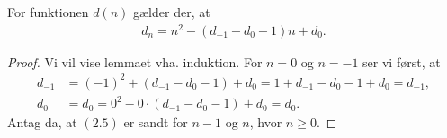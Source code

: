 \begin{lemma}
For funktionen $d(n)$ gælder der, at 
\begin{align}
	d_n = n^2 - (d_{-1} - d_0 - 1)n + d_0.
\end{align}
\end{lemma}
\begin{proof}
Vi vil vise lemmaet vha. induktion. For $n=0$ og $n=-1$ ser vi først, at
\begin{align*}
	d_{-1} &= (-1)^2 + (d_{-1} - d_0 - 1) + d_0 = 1 + d_{-1} - d_0 -1 + d_0 = d_{-1}, \\
	d_0 &= d_0 = 0^2 - 0 \cdot (d_{-1} - d_0 - 1) + d_0 = d_0.
\end{align*}
Antag da, at $(2.5)$ er sandt for $n-1$ og $n$, hvor $n \geq 0$.
\end{proof}
























